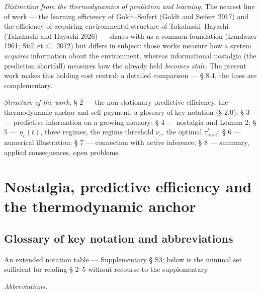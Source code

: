 \documentclass[pdflatex,sn-mathphys-ay]{sn-jnl}
\begin{document}
\emph{Distinction from the thermodynamics of prediction and learning.} The nearest line of work --- the learning efficiency of Goldt--Seifert (Goldt and Seifert 2017) and the efficiency of acquiring environmental structure of Takahashi--Hayashi (Takahashi and Hayashi 2026) --- shares with us a common foundation (Landauer 1961; Still et al.~2012) but differs in subject: those works measure how a system \emph{acquires} information about the environment, whereas informational nostalgia (the prediction shortfall) measures how the already held \emph{becomes stale}. The present work makes this holding cost central; a detailed comparison --- § 8.4, the lines are complementary.



\emph{Structure of the work.} § 2 --- the non-stationary predictive efficiency, the thermodynamic anchor and self-payment, a glossary of key notation (§ 2.0); § 3 --- predictive information on a growing memory; § 4 --- nostalgia and Lemma 2; § 5 --- \(\eta_v(t)\), three regimes, the regime threshold \(\nu_c\), the optimal \(\tau_{\text{reset}}^*\); § 6 --- numerical illustration; § 7 --- connection with active inference; § 8 --- summary, applied consequences, open problems.



\section{Nostalgia, predictive efficiency and the thermodynamic anchor}\label{nostalgia-predictive-efficiency-and-the-thermodynamic-anchor}



\subsection{Glossary of key notation and abbreviations}\label{glossary-of-key-notation-and-abbreviations}



An extended notation table --- Supplementary § S3; below is the minimal set sufficient for reading § 2--5 without recourse to the supplementary.



\emph{Abbreviations.}
\end{document}
